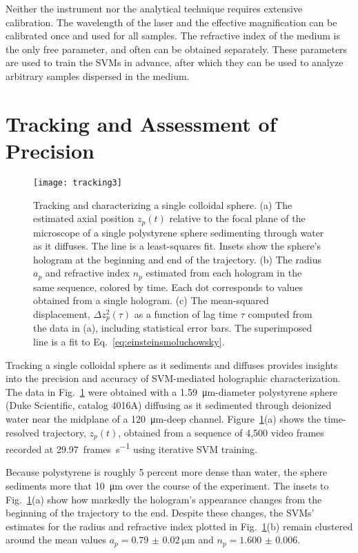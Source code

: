 \documentclass[10pt,letterpaper]{article}
\begin{document}
Neither the instrument nor the analytical technique requires
extensive calibration.
The wavelength of the laser and the effective magnification can be
calibrated once and used for all samples.
The refractive index of the medium is the only free parameter, 
and often can be obtained separately.
These parameters are used to train the SVMs in advance,
after which they can be used to analyze arbitrary samples
dispersed in the medium.

\section{Tracking and Assessment of Precision}

\begin{figure}
  \centering
  \texttt{[image: tracking3]}
  \caption{Tracking and characterizing a single colloidal sphere.
    (a) The estimated axial position $z_p(t)$ relative to the focal plane
    of the microscope of a single polystyrene sphere sedimenting
    through water as it diffuses.  The line is a least-squares fit.
    Insets show the sphere's hologram at the beginning and end
    of the trajectory.
    (b) The radius $a_p$ and refractive index $n_p$
    estimated from each hologram in the same sequence, colored
    by time.  Each dot corresponds to values obtained from a single
    hologram.
    (c) The mean-squared displacement, $\Delta z_p^2(\tau)$ as a function
    of lag time $\tau$ computed from the data in (a), including
    statistical error bars.  The superimposed line is a fit to
    Eq.~\eqref{eq:einsteinsmoluchowsky}.}
  \label{fig:values}
\end{figure}

Tracking a single colloidal sphere as it sediments and diffuses
provides insights into
the precision and accuracy of SVM-mediated holographic characterization.
The data in Fig.~\ref{fig:values} were obtained with
a \SI{1.59}{\um}-diameter
polystyrene sphere (Duke Scientific, catalog 4016A)
diffusing as it sedimented through
deionized water near the midplane of
a \SI{120}{\um}-deep channel.
Figure~\ref{fig:values}(a) shows the time-resolved
trajectory, $z_p(t)$, obtained from a sequence of 4,500 video frames
recorded at \SI{29.97}{frames\per\second} using iterative
SVM training.

Because polystyrene is roughly 5 percent more dense than water,
the sphere sediments
more that \SI{10}{\um} over the
course of the experiment.
The insets to Fig.~\ref{fig:values}(a) show how markedly
the hologram's appearance changes from the beginning
of the trajectory to the end.
Despite these changes, the SVMs' estimates for the
radius and refractive index plotted in Fig.~\ref{fig:values}(b)
remain clustered around the mean values
$a_p = \SI{0.79(2)}{\um}$
and 
$n_p = \num{1.600(6)}$.
\end{document}
